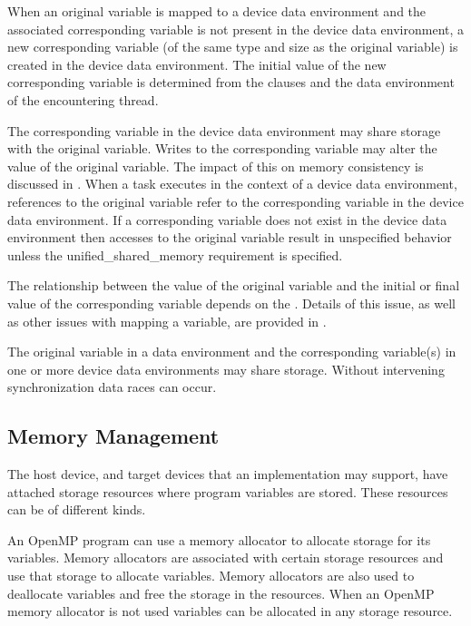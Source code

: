 When an original variable is mapped to a device data environment and the associated corresponding variable is not present in the device data environment, a new corresponding variable (of the same type and size as the original variable) is created in the device data environment. The initial value of the new corresponding variable is determined from the clauses and the data environment of the encountering thread.

The corresponding variable in the device data environment may share storage with the
original variable. Writes to the corresponding variable may alter the value of the original
variable. The impact of this on memory consistency is discussed in 
. 
When a task executes in the context of a device data environment, references to  
the original variable refer to the corresponding variable in the device data environment.
If a corresponding variable does not exist in the device data
environment then accesses to the original variable result in
unspecified behavior unless the unified\_shared\_memory requirement
is specified.

The relationship between the value of the original variable and the initial or final value
of the corresponding variable depends on the . Details of this issue, as well as
other issues with mapping a variable, are provided in .

The original variable in a data environment and the corresponding variable(s) in one or
more device data environments may share storage. Without intervening synchronization  
data races can occur.

\subsection{Memory Management}

The host device, and target devices that an implementation may support, have attached storage resources where program variables are stored. These resources can be of different kinds. 

An OpenMP program can use a memory allocator to allocate storage for its variables. Memory allocators are associated with certain storage resources and use that storage to allocate variables. Memory allocators are also used to deallocate variables and free the storage in the resources. When an OpenMP memory allocator is not used variables can be allocated in any storage resource. 


